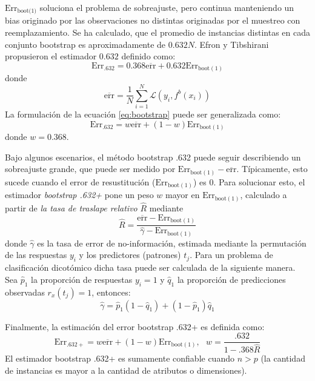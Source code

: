 \documentclass{article}
\begin{document}
$\text{Err}_{\text{boot(1)}}$ soluciona el problema de sobreajuste, pero continua manteniendo un bias originado por las observaciones no distintas originadas por el muestreo con reemplazamiento.
Se ha calculado, que el promedio de instancias distintas en cada conjunto bootstrap es aproximadamente de $0.632N$.
Efron y Tibshirani propusieron el estimador $0.632$ definido como:
\begin{equation}
	\text{Err}_{.632} = 0.368 \overline{\text{err}} + 0.632 \text{Err}_{\text{boot}(1)}
	\label{eq:bootstrap}
\end{equation}
donde
$$
\overline{\text{err}} = \frac{1}{N} \sum_{i=1}^{N} \mathcal{L}(y_i,f^b(x_i))
$$
La formulación de la ecuación \ref{eq:bootstrap} puede ser generalizada como:
\begin{equation}
	\text{Err}_{.632} = w \overline{\text{err}} + (1 - w) \text{Err}_{\text{boot}(1)}
\end{equation}
donde $w=0.368$.


Bajo algunos escenarios, el método bootstrap .632 puede seguir describiendo un sobreajuste grande, que puede ser medido por $\text{Err}_{\text{boot}(1)} - \overline{\text{err}}$.
Típicamente, esto sucede cuando el error de resustitución ($\text{Err}_{\text{boot}(1)}$) es $0$.
Para solucionar esto, el estimador \emph{bootstrap .632+} pone un peso $w$ mayor en $\text{Err}_{\text{boot}(1)}$, calculado a partir de \emph{la tasa de traslape relativo} $\hat{R}$ mediante
$$
\hat{R} = \frac{\overline{\text{err}} - \text{Err}_{\text{boot}(1)}}{\hat{\gamma} - \text{Err}_{\text{boot}(1)}}
$$
donde $\hat{\gamma}$ es la tasa de error de no-información, estimada mediante la permutación de las respuestas $y_i$ y los predictores (patrones) $t_j$.
Para un problema de clasificación dicotómico dicha tasa puede ser calculada de la siguiente manera.
Sea $\hat{p}_1$ la proporción de respuestas $y_i = 1$  y $\hat{q}_1$ la proporción de predicciones observadas $r_x(t_j) = 1$, entonces:
\begin{equation}
	\hat{\gamma} = \hat{p}_1(1-\hat{q}_1) + (1-\hat{p}_1) \hat{q}_1
\end{equation}

Finalmente, la estimación del error bootstrap .632+ es definida como:
\begin{equation}
	\text{Err}_{.632+} = w \overline{\text{err}} + (1 - w) \text{Err}_{\text{boot}(1)}, \text{ } w = \frac{.632}{1-.368\hat{R}}
\end{equation}
El estimador bootstrap .632+ es sumamente confiable cuando $n>p$ (la cantidad de instancias es mayor a la cantidad de atributos o dimensiones).
\end{document}
